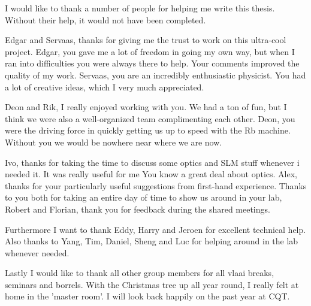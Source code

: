 \noindent I would like to thank a number of people for helping me write this thesis. 
Without their help, it would not have been completed.

Edgar and Servaas, thanks for giving me the trust to work on this ultra-cool project. 
Edgar, you gave me a lot of freedom in going my own way, but when I ran into difficulties you were always there to help. 
Your comments improved the quality of my work. 
Servaas, you are an incredibly enthusiastic physicist. 
You had a lot of creative ideas, which I very much appreciated. 

Deon and Rik, I really enjoyed working with you.
We had a ton of fun, but I think we were also a well-organized team complimenting each other.
Deon, you were the driving force in quickly getting us up to speed with the Rb machine.
Without you we would be nowhere near where we are now.

Ivo, thanks for taking the time to discuss some optics and SLM stuff whenever i needed it. 
It was really useful for me 
You know a great deal about optics.
Alex, thanks for your particularly useful suggestions from first-hand experience. 
Thanks to you both for taking an entire day of time to show us around in your lab, 
Robert and Florian, thank you for feedback during the shared meetings.

Furthermore I want to thank Eddy, Harry and Jeroen for excellent technical help. 
Also thanks to Yang, Tim, Daniel, Sheng and Luc for helping around in the lab whenever needed.

Lastly I would like to thank all other group members for all vlaai breaks, seminars and borrels. 
With the Christmas tree up all year round, I really felt at home in the 'master room'. 
I will look back happily on the past year at CQT. 
